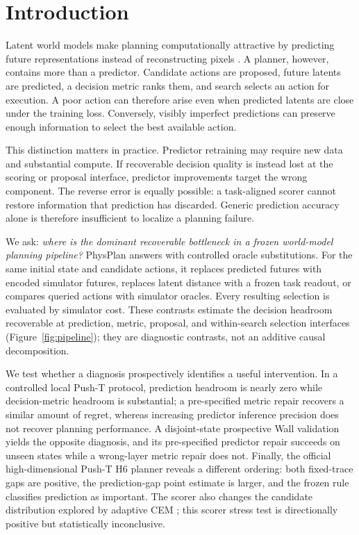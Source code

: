 \section{Introduction}
\label{sec:introduction}

Latent world models make planning computationally attractive by predicting future representations instead of reconstructing pixels \citep{hafner2019planet,zhou2025dinowm,assran2025vjepa2,terver2026jepawms}. A planner, however, contains more than a predictor. Candidate actions are proposed, future latents are predicted, a decision metric ranks them, and search selects an action for execution. A poor action can therefore arise even when predicted latents are close under the training loss. Conversely, visibly imperfect predictions can preserve enough information to select the best available action.

This distinction matters in practice. Predictor retraining may require new data and substantial compute. If recoverable decision quality is instead lost at the scoring or proposal interface, predictor improvements target the wrong component. The reverse error is equally possible: a task-aligned scorer cannot restore information that prediction has discarded. Generic prediction accuracy alone is therefore insufficient to localize a planning failure.

We ask: \emph{where is the dominant recoverable bottleneck in a frozen world-model planning pipeline?} PhysPlan answers with controlled oracle substitutions. For the same initial state and candidate actions, it replaces predicted futures with encoded simulator futures, replaces latent distance with a frozen task readout, or compares queried actions with simulator oracles. Every resulting selection is evaluated by simulator cost. These contrasts estimate the decision headroom recoverable at prediction, metric, proposal, and within-search selection interfaces (Figure~\ref{fig:pipeline}); they are diagnostic contrasts, not an additive causal decomposition.

We test whether a diagnosis prospectively identifies a useful intervention. In a controlled local Push-T protocol, prediction headroom is nearly zero while decision-metric headroom is substantial; a pre-specified metric repair recovers a similar amount of regret, whereas increasing predictor inference precision does not recover planning performance. A disjoint-state prospective Wall validation yields the opposite diagnosis, and its pre-specified predictor repair succeeds on unseen states while a wrong-layer metric repair does not. Finally, the official high-dimensional Push-T H6 planner reveals a different ordering: both fixed-trace gaps are positive, the prediction-gap point estimate is larger, and the frozen rule classifies prediction as important. The scorer also changes the candidate distribution explored by adaptive CEM \citep{rubinstein1999cem}; this scorer stress test is directionally positive but statistically inconclusive.


